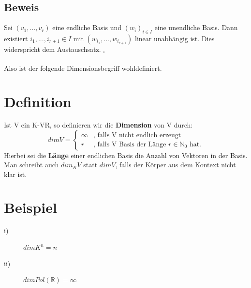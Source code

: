 \documentclass{scrbook}
\begin{document}
\subsection*{Beweis}
Sei $(v_1,...,v_r)$ eine endliche Basis und $(w_i)_{i\in I}$ eine unendliche Basis. Dann existiert $i_1,...,i_{r+1}\in I$ mit $(w_{i_1},...,w_{i_{r+1}})$ linear unabhängig ist. Dies widerspricht dem Austauschsatz. $_\square$\\\\
Also ist der folgende Dimensionsbegriff wohldefiniert.
\section{Definition}
Ist V ein K-VR, so definieren wir die \textbf{Dimension} von V durch:
\[
dimV=\left\{\begin{array}{cl}
\infty &\text{, falls V nicht endlich erzeugt}\\
r&\text{, falls V Basis der Länge } r \in \mathbb{N}_0\text{ hat.}
\end{array}\right.
\]
Hierbei sei die \textbf{Länge} einer endlichen Basis die Anzahl von Vektoren in der Basis. Man schreibt auch $dim_KV$ statt $dimV$, falls der Körper aus dem Kontext nicht klar ist.
\section{Beispiel}
\begin{description}
\item[i)] $dimK^n=n$
\item[ii)] $dim Pol(\mathbb{R}) = \infty$
\end{description}
\end{document}
